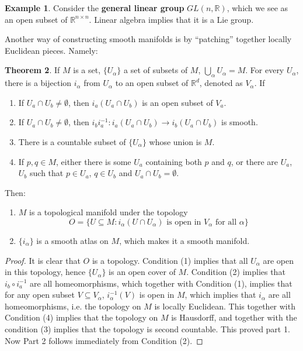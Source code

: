 \documentclass{article}
\theoremstyle{definition}
\newtheorem{thm}{Theorem}[section]
\newtheorem{exm}[thm]{Example}
\begin{document}
\begin{exm}
    Consider the {\bf general linear group} $GL(n, \mathbb{R})$, which we see as an open subset of $\mathbb{R}^{n\times n}$. Linear algebra implies that it is a Lie group.
\end{exm}

Another way of constructing smooth manifolds is by ``patching'' together locally Euclidean pieces. Namely:

\begin{thm}
    If $M$ is a set, $\{U_\alpha\}$ a set of subsets of $M$, $\bigcup_\alpha U_\alpha=M$. For every $U_\alpha$, there is a bijection $i_\alpha$ from $U_\alpha$ to an open subset of $\mathbb{R}^d$, denoted as $V_\alpha$. If
    \begin{enumerate}[(1)]
        \item If $U_a\cap U_b\not=\emptyset$, then $i_a(U_a\cap U_b)$ is an open subset of $V_a$.
        \item If $U_a\cap U_b\not=\emptyset$, then $i_bi_a^{-1}: i_a(U_a\cap U_b)\rightarrow i_b(U_a\cap U_b)$ is smooth.
        \item There is a countable subset of $\{U_\alpha\}$ whose union is $M$.
        \item If $p, q\in M$, either there is some $U_a$ containing both $p$ and $q$, or there are $U_a$, $U_b$ such that $p\in U_a$, $q\in U_b$ and $U_a\cap U_b=\emptyset$.
    \end{enumerate}
    Then:
    \begin{enumerate}
        \item $M$ is a topological manifold under the topology 
        \[O=\{U\subseteq M: i_\alpha(U\cap U_\alpha)\text{ is open in }V_\alpha\text{ for all }\alpha\}\]
        \item $\{i_\alpha\}$ is a smooth atlas on $M$, which makes it a smooth manifold.
    \end{enumerate}
\end{thm}

\begin{proof}
     It is clear that $O$ is a topology. Condition (1) implies that all $U_\alpha$ are open in this topology, hence $\{U_\alpha\}$ is an open cover of $M$. Condition (2) implies that $i_b\circ i_a^{-1}$ are all homeomorphisms, which together with Condition (1), implies that for any open subset $V\subseteq V_\alpha$, $i_\alpha^{-1}(V)$ is open in $M$, which implies that $i_\alpha$ are all homeomorphisms, i.e. the topology on $M$ is locally Euclidean. This together with Condition (4) implies that the topology on $M$ is Hausdorff, and together with the condition (3) implies that the topology is second countable. This proved part 1. Now Part 2 follows immediately from Condition (2).
\end{proof}
\end{document}
